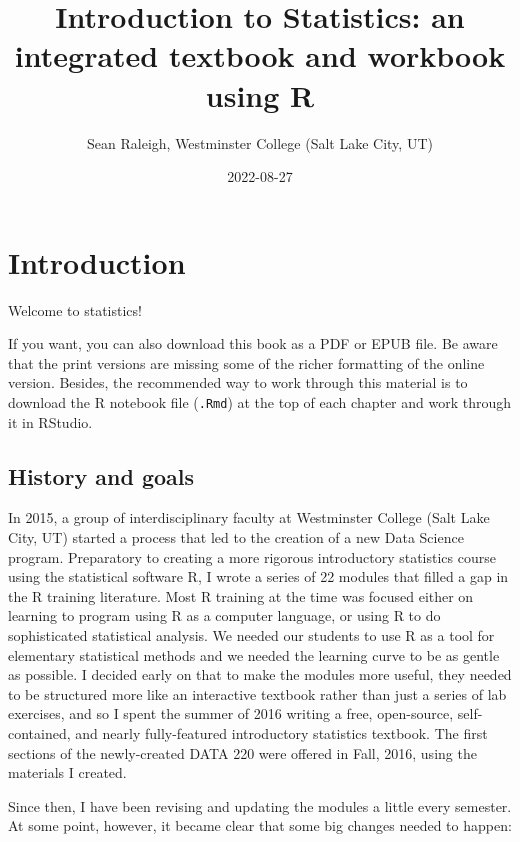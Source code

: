 \documentclass[
]{book}
\title{Introduction to Statistics: an integrated textbook and workbook using R}
\author{Sean Raleigh, Westminster College (Salt Lake City, UT)}
\date{2022-08-27}
\begin{document}
\maketitle

{
\setcounter{tocdepth}{1}
\tableofcontents
}
\hypertarget{intro}{%
\chapter*{Introduction}\label{intro}}

Welcome to statistics!

If you want, you can also download this book as a PDF or EPUB file. Be aware that the print versions are missing some of the richer formatting of the online version. Besides, the recommended way to work through this material is to download the R notebook file (\texttt{.Rmd}) at the top of each chapter and work through it in RStudio.

\hypertarget{intro-history}{%
\section*{History and goals}\label{intro-history}}

In 2015, a group of interdisciplinary faculty at Westminster College (Salt Lake City, UT) started a process that led to the creation of a new Data Science program. Preparatory to creating a more rigorous introductory statistics course using the statistical software R, I wrote a series of 22 modules that filled a gap in the R training literature. Most R training at the time was focused either on learning to program using R as a computer language, or using R to do sophisticated statistical analysis. We needed our students to use R as a tool for elementary statistical methods and we needed the learning curve to be as gentle as possible. I decided early on that to make the modules more useful, they needed to be structured more like an interactive textbook rather than just a series of lab exercises, and so I spent the summer of 2016 writing a free, open-source, self-contained, and nearly fully-featured introductory statistics textbook. The first sections of the newly-created DATA 220 were offered in Fall, 2016, using the materials I created.

Since then, I have been revising and updating the modules a little every semester. At some point, however, it became clear that some big changes needed to happen:
\end{document}
